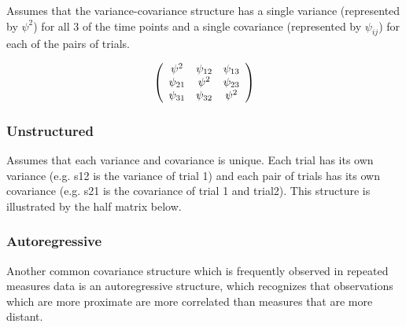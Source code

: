 \documentclass[12pt, a4paper]{article}
\theoremstyle{plain}
\theoremstyle{definition}
\theoremstyle{remark}
\begin{document}
	Assumes that the variance-covariance structure has a single variance (represented by $\psi^2$)
	for all 3 of the time points and a single covariance (represented by $\psi_{ij}$) for each of the pairs of trials.
	
	\[
	\left(%
	\begin{array}{c c c}
	\psi^2 &  \psi_{12} & \psi_{13}   \\
	\psi_{21} & \psi^2 & \psi_{23}   \\
	\psi_{31} & \psi_{32} & \psi^2   \\
	\end{array}%
	\right)
	\]
	
	
	\subsubsection*{Unstructured}
	
	Assumes that each variance and covariance is unique.
	Each trial has its own variance (e.g. s12 is the variance of trial 1)
	and each pair of trials has its own covariance (e.g. s21 is the covariance of trial 1 and trial2).
	This structure is illustrated by the half matrix below.
	
	
	\subsubsection*{Autoregressive}
	
	Another common covariance structure which is frequently observed
	in repeated measures data is an autoregressive structure,
	which recognizes that observations which are more proximate
	are more correlated than measures that are more distant.
	
			
\end{document}
